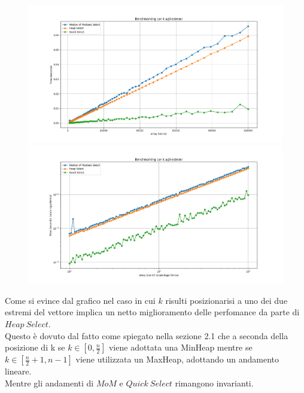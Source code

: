 \documentclass[a4paper]{article}
\begin{document}
\begin{figure}[h]
            \centering
            \includegraphics[width=.83\textwidth]{graphs/K_last_n.png}
            \includegraphics[width=.83\textwidth]{graphs/K_last_2xlog.png}
\end{figure}
Come si evince dal grafico nel caso in cui $k$ risulti posizionarisi a uno dei due estremi del vettore implica un netto miglioramento delle perfomance da parte di $Heap\ Select$.\\
Questo è dovuto dal fatto come spiegato nella sezione 2.1 che a seconda della posizione di k se $k\in[0,\frac{n}{2}]$ viene adottata una MinHeap mentre se $k\in[\frac{n}{2}+1,n-1]$ viene utilizzata un MaxHeap, adottando un andamento lineare.\\
Mentre gli andamenti di $MoM$ e $Quick\ Select$ rimangono invarianti.\\
\newpage
\end{document}
